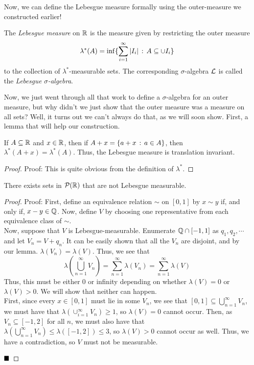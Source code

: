 Now, we can define the Lebesgue measure formally using the outer-measure we constructed earlier!

\begin{definition}
    The \emph{Lebesgue measure} on $\R$ is the measure given by restricting the outer measure
    \[ \lambda^{*}(A) = \inf\{\sum_{i = 1}^{\infty} \abs{I_{i}} \col A \subseteq \cup I_{i}\} \]
    to the collection of $\lambda^{*}$-measurable sets. The corresponding $\sigma$-algebra $\cal{L}$ is called the \emph{Lebesgue $\sigma$-algebra}.
\end{definition}

Now, we just went through all that work to define a $\sigma$-algebra for an outer measure, but why didn't we just show that the outer measure was a measure on all sets? Well, it turns out we can't always do that, as we will soon show. First, a lemma that will help our construction.
\clearpage

\begin{lemma}
    If $A \subseteq \R$ and $x \in \R$, then if $A + x = \{a + x \col a \in A\}$, then $\lambda^{*}(A + x) = \lambda^{*}(A)$. Thus, the Lebesgue measure is translation invariant.
\end{lemma}
\begin{proof}{Proof:}
    This is quite obvious from the definition of $\lambda^{*}$.
\end{proof}

\begin{theorem}
    There exists sets in $\cal{P}(\R)$ that are not Lebesgue measurable.
\end{theorem}
\begin{proof}{Proof:}
    First, define an equivalence relation $\sim$ on $[0, 1]$ by $x \sim y$ if, and only if, $x - y \in \Q$. Now, define $V$ by choosing one representative from each equivalence class of $\sim$.\\

    Now, suppose that $V$ is Lebesgue-measurable. Enumerate $\Q \cap [-1, 1]$ as $q_1, q_2, \cdots$ and let $V_n = V + q_n$. It can be easily shown that all the $V_n$ are disjoint, and by our lemma. $\lambda(V_n) = \lambda(V)$. Thus, we see that
    \[ \lambda\left(\bigcup_{n = 1}^{\infty} V_n\right) = \sum_{n = 1}^{\infty} \lambda(V_n) = \sum_{n = 1}^{\infty} \lambda(V) \]
    Thus, this must be either $0$ or infinity depending on whether $\lambda(V) = 0$ or $\lambda(V) > 0$. We will show that neither can happen.\\

    First, since every $x \in [0, 1]$ must lie in some $V_n$, we see that $[0, 1] \subseteq \bigcup_{n = 1}^{\infty} V_n$, we must have that $\lambda(\cup_{i = 1}^{\infty}V_n) \geq 1$, so $\lambda(V) = 0$ cannot occur. Then, as $V_n \subseteq [-1, 2]$ for all $n$, we must also have that $\lambda(\bigcup_{n = 1}^{\infty} V_n) \leq \lambda([-1, 2]) \leq 3$, so $\lambda(V) > 0$ cannot occur as well. Thus, we have a contradiction, so $V$ must not be measurable.

    $\qed$
\end{proof}

